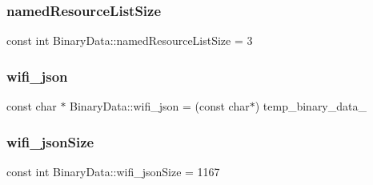 \subsubsection{\texorpdfstring{named\+Resource\+List\+Size}{namedResourceListSize}}
{\footnotesize\ttfamily const int Binary\+Data\+::named\+Resource\+List\+Size = 3}

\mbox{\label{namespaceBinaryData_a72aa1073c893ca2868c3bae5e803e68b}} 
\subsubsection{\texorpdfstring{wifi\+\_\+json}{wifi\_json}}
{\footnotesize\ttfamily const char $\ast$ Binary\+Data\+::wifi\+\_\+json = (const char$\ast$) temp\+\_\+binary\+\_\+data\+\_}

\mbox{\label{namespaceBinaryData_a7bf5b74a25a25cc39e2f0ce38fa8a2dd}} 
\subsubsection{\texorpdfstring{wifi\+\_\+json\+Size}{wifi\_jsonSize}}
{\footnotesize\ttfamily const int Binary\+Data\+::wifi\+\_\+json\+Size = 1167}

